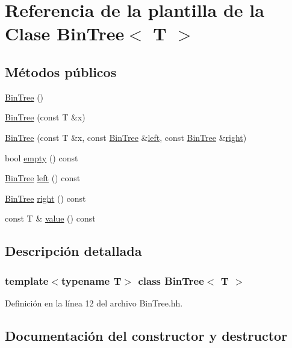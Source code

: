 \hypertarget{class_bin_tree}{}\section{Referencia de la plantilla de la Clase Bin\+Tree$<$ T $>$}
\label{class_bin_tree}
\subsection*{Métodos públicos}
\begin{DoxyCompactItemize}
\item 
\hyperlink{class_bin_tree_a47eef22d29cd023449d97c073c08e5b6}{Bin\+Tree} ()
\item 
\hyperlink{class_bin_tree_a1ab686e0bcf990093ff91fe71744c1a4}{Bin\+Tree} (const T \&x)
\item 
\hyperlink{class_bin_tree_adb7eeff76d08130c943b36af215eb521}{Bin\+Tree} (const T \&x, const \hyperlink{class_bin_tree}{Bin\+Tree} \&\hyperlink{class_bin_tree_a82108db4c1b08d1f111027788c196d4e}{left}, const \hyperlink{class_bin_tree}{Bin\+Tree} \&\hyperlink{class_bin_tree_aff8e96651b27284c329667b5ad3e4d0b}{right})
\item 
bool \hyperlink{class_bin_tree_a74cda259ba5c25b8ee38ed4dc33e4fad}{empty} () const
\item 
\hyperlink{class_bin_tree}{Bin\+Tree} \hyperlink{class_bin_tree_a82108db4c1b08d1f111027788c196d4e}{left} () const
\item 
\hyperlink{class_bin_tree}{Bin\+Tree} \hyperlink{class_bin_tree_aff8e96651b27284c329667b5ad3e4d0b}{right} () const
\item 
const T \& \hyperlink{class_bin_tree_a734e785b089c87b49187ee7c58edf5f3}{value} () const
\end{DoxyCompactItemize}


\subsection{Descripción detallada}
\subsubsection*{template$<$typename T$>$\newline
class Bin\+Tree$<$ T $>$}



Definición en la línea 12 del archivo Bin\+Tree.\+hh.



\subsection{Documentación del constructor y destructor}
\mbox{\label{class_bin_tree_a47eef22d29cd023449d97c073c08e5b6}} 
